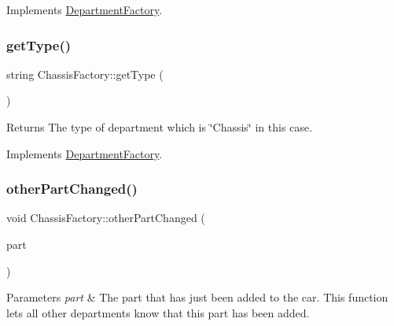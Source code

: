 Implements \hyperlink{classDepartmentFactory_a6080a560efb9fe0b9c870db5a7358886}{Department\+Factory}.

\mbox{\label{classChassisFactory_af038789501da489aeccb19520dc09686}} 
\subsubsection{\texorpdfstring{get\+Type()}{getType()}}
{\footnotesize\ttfamily string Chassis\+Factory\+::get\+Type (\begin{DoxyParamCaption}{ }\end{DoxyParamCaption})\hspace{0.3cm}{\ttfamily [virtual]}}

\begin{DoxyReturn}{Returns}
The type of department which is \char`\"{}\+Chassis\char`\"{} in this case. 
\end{DoxyReturn}


Implements \hyperlink{classDepartmentFactory_a5aac775b89c4c390ad885e1de8947b0d}{Department\+Factory}.

\mbox{\label{classChassisFactory_a15eb17dfcb995b9dcc75d4908e49a17f}} 
\subsubsection{\texorpdfstring{other\+Part\+Changed()}{otherPartChanged()}}
{\footnotesize\ttfamily void Chassis\+Factory\+::other\+Part\+Changed (\begin{DoxyParamCaption}\item[{\hyperlink{classDepartmentOutput}{Department\+Output} $\ast$}]{part }\end{DoxyParamCaption})\hspace{0.3cm}{\ttfamily [virtual]}}


\begin{DoxyParams}{Parameters}
{\em part} & The part that has just been added to the car. This function lets all other departments know that this part has been added. \\
\hline
\end{DoxyParams}


